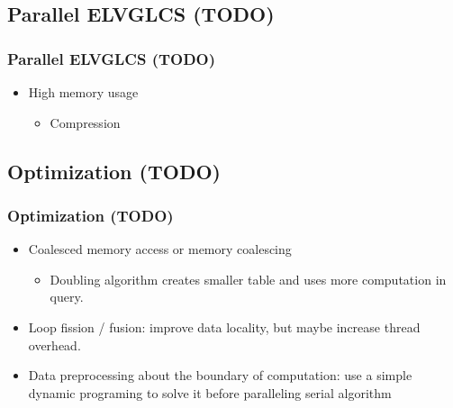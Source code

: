 \subsection{Parallel ELVGLCS (TODO)}
\begin{frame}
	\frametitle{Parallel ELVGLCS (TODO)}
	\begin{itemize}
		\item High memory usage 
			\begin{itemize}
				\item Compression
			\end{itemize}
	\end{itemize}
\end{frame}

\subsection{Optimization (TODO)}
\begin{frame}
	\frametitle{Optimization (TODO)}
	\begin{itemize}
		\setlength\itemsep{1em}
		\item Coalesced memory access or memory coalescing
			\begin{itemize}
				\item Doubling algorithm creates smaller table
					and uses more computation in query.
			\end{itemize}
		\item Loop fission / fusion: improve data locality, 
			but maybe increase thread overhead.
		\item Data preprocessing about the boundary of computation: use a simple dynamic programing to solve it before paralleling serial algorithm
	\end{itemize}
\end{frame}